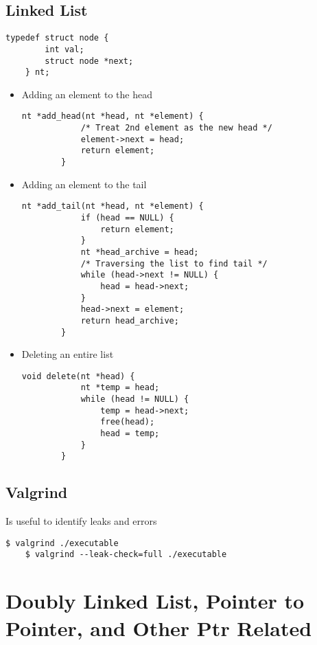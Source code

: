 \documentclass{article}
\begin{document}
\subsection{Linked List}
\begin{lstlisting}[style=CStyle]
    typedef struct node {
        int val;
        struct node *next;
    } nt;
\end{lstlisting}

\begin{itemize}
    \item Adding an element to the head
    \begin{lstlisting}[style=CStyle]
        nt *add_head(nt *head, nt *element) {
            /* Treat 2nd element as the new head */
            element->next = head;
            return element;
        }
    \end{lstlisting}
    \item Adding an element to the tail
    \begin{lstlisting}[style=CStyle]
        nt *add_tail(nt *head, nt *element) {
            if (head == NULL) {
                return element;
            }
            nt *head_archive = head;
            /* Traversing the list to find tail */
            while (head->next != NULL) {
                head = head->next;
            }
            head->next = element;
            return head_archive;
        }
    \end{lstlisting}
    \item Deleting an entire list
    \begin{lstlisting}[style=CStyle]
        void delete(nt *head) {
            nt *temp = head;
            while (head != NULL) {
                temp = head->next;
                free(head);
                head = temp;
            }
        }
    \end{lstlisting}
\end{itemize}

\subsection{Valgrind}
Is useful to identify leaks and errors
\begin{lstlisting}[style=BashStyle]
    $ valgrind ./executable
    $ valgrind --leak-check=full ./executable
\end{lstlisting}

\section{Doubly Linked List, Pointer to Pointer, and Other Ptr Related}
\end{document}
